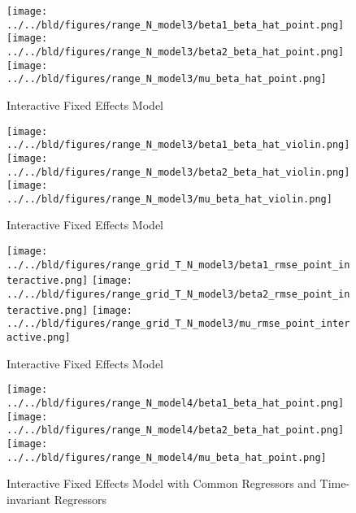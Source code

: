 \documentclass[a4paper]{article}
\begin{document}
\clearpage
\begin{figure}[h]
\centering
\texttt{[image: ../../bld/figures/range\_N\_model3/beta1\_beta\_hat\_point.png]}
\centering
\texttt{[image: ../../bld/figures/range\_N\_model3/beta2\_beta\_hat\_point.png]}
\centering
\texttt{[image: ../../bld/figures/range\_N\_model3/mu\_beta\_hat\_point.png]}
\centering
\caption{Interactive Fixed Effects Model}
\label{figure:figure7}
\end{figure}

\clearpage
\begin{figure}[h]
\centering
\texttt{[image: ../../bld/figures/range\_N\_model3/beta1\_beta\_hat\_violin.png]}
\centering
\texttt{[image: ../../bld/figures/range\_N\_model3/beta2\_beta\_hat\_violin.png]}
\centering
\texttt{[image: ../../bld/figures/range\_N\_model3/mu\_beta\_hat\_violin.png]}
\centering
\caption{Interactive Fixed Effects Model}
\label{figure:figure8}
\end{figure}

\clearpage
\begin{figure}[]
\centering
\texttt{[image: ../../bld/figures/range\_grid\_T\_N\_model3/beta1\_rmse\_point\_interactive.png]}
\centering
\texttt{[image: ../../bld/figures/range\_grid\_T\_N\_model3/beta2\_rmse\_point\_interactive.png]}
\centering
\texttt{[image: ../../bld/figures/range\_grid\_T\_N\_model3/mu\_rmse\_point\_interactive.png]}
\centering
\caption{Interactive Fixed Effects Model}
\label{figure:figure9}
\end{figure}

\clearpage

\begin{figure}[]
\centering
\texttt{[image: ../../bld/figures/range\_N\_model4/beta1\_beta\_hat\_point.png]}
\centering
\texttt{[image: ../../bld/figures/range\_N\_model4/beta2\_beta\_hat\_point.png]}
\centering
\texttt{[image: ../../bld/figures/range\_N\_model4/mu\_beta\_hat\_point.png]}
\centering
\caption{\centering Interactive Fixed Effects Model with Common Regressors and Time-invariant Regressors}
\label{figure:figure10}
\end{figure}
\end{document}
